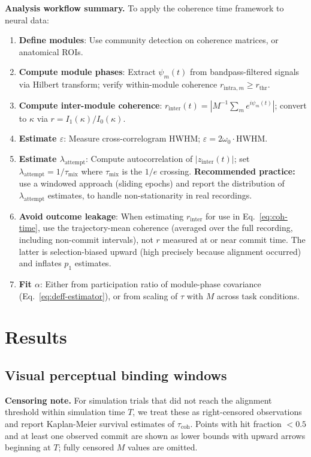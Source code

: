 \documentclass[12pt]{article}
\begin{document}
\textbf{Analysis workflow summary.} To apply the coherence time framework to neural data:
\begin{enumerate}
\item \textbf{Define modules}: Use community detection on coherence matrices, or anatomical ROIs.
\item \textbf{Compute module phases}: Extract $\psi_m(t)$ from bandpass-filtered signals via Hilbert transform; verify within-module coherence $r_{\mathrm{intra},m} \geq r_{\mathrm{thr}}$.
\item \textbf{Compute inter-module coherence}: $r_{\mathrm{inter}}(t) = |M^{-1}\sum_m e^{i\psi_m(t)}|$; convert to $\kappa$ via $r = I_1(\kappa)/I_0(\kappa)$.
\item \textbf{Estimate $\varepsilon$}: Measure cross-correlogram HWHM; $\varepsilon = 2\omega_0 \cdot \mathrm{HWHM}$.
\item \textbf{Estimate $\lambda_{\mathrm{attempt}}$}: Compute autocorrelation of $|z_{\mathrm{inter}}(t)|$; set $\lambda_{\mathrm{attempt}} = 1/\tau_{\mathrm{mix}}$ where $\tau_{\mathrm{mix}}$ is the $1/e$ crossing. \textbf{Recommended practice:} use a windowed approach (sliding epochs) and report the distribution of $\lambda_{\mathrm{attempt}}$ estimates, to handle non-stationarity in real recordings.
\item \textbf{Avoid outcome leakage}: When estimating $r_{\mathrm{inter}}$ for use in Eq.~\ref{eq:coh-time}, use the trajectory-mean coherence (averaged over the full recording, including non-commit intervals), not $r$ measured at or near commit time. The latter is selection-biased upward (high precisely because alignment occurred) and inflates $p_1$ estimates.
\item \textbf{Fit $\alpha$}: Either from participation ratio of module-phase covariance (Eq.~\ref{eq:deff-estimator}), or from scaling of $\tau$ with $M$ across task conditions.
\end{enumerate}

\section{Results}

\subsection{Visual perceptual binding windows}

\textbf{Censoring note.} For simulation trials that did not reach the alignment threshold within simulation time $T$, we treat these as right-censored observations and report Kaplan-Meier survival estimates of $\tau_{\mathrm{coh}}$. Points with hit fraction $< 0.5$ and at least one observed commit are shown as lower bounds with upward arrows beginning at $T$; fully censored $M$ values are omitted.
\end{document}
